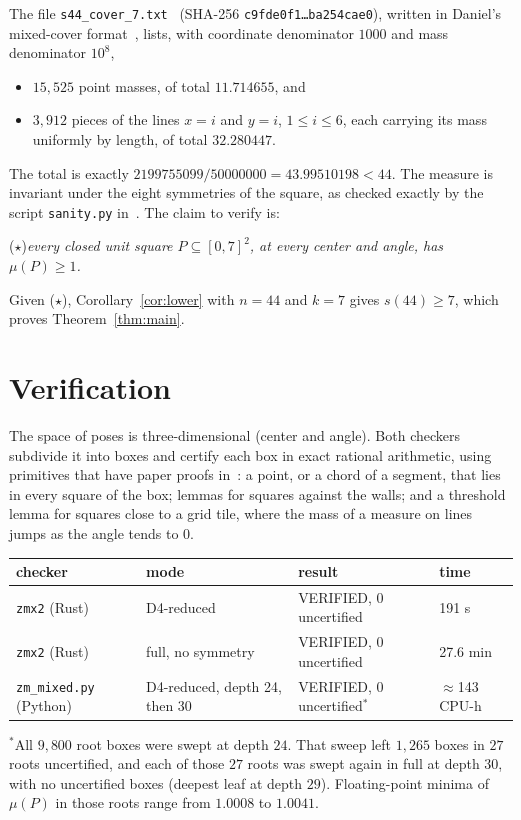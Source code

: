 \documentclass[11pt]{amsart}
\theoremstyle{remark}
\begin{document}
The file \texttt{s44\_cover\_7.txt}~\cite{repo} (SHA-256 \texttt{c9fde0f1\ldots ba254cae0}), written in Daniel's
mixed-cover format~\cite{daniel}, lists, with coordinate denominator $1000$ and mass denominator $10^8$,
\begin{itemize}
\item $15{,}525$ point masses, of total $11.714655$, and
\item $3{,}912$ pieces of the lines $x=i$ and $y=i$, $1\le i\le6$, each carrying its mass uniformly by length, of
total $32.280447$.
\end{itemize}
The total is exactly $2199755099/50000000=43.99510198<44$. The measure is invariant under the eight symmetries
of the square, as checked exactly by the script \texttt{sanity.py} in~\cite{repo}. The claim to verify is:

\smallskip
\noindent($\star$)\quad \emph{every closed unit square $P\subseteq[0,7]^2$, at every center and angle, has
$\mu(P)\ge1$.}
\smallskip

\noindent Given ($\star$), Corollary~\ref{cor:lower} with $n=44$ and $k=7$ gives $s(44)\ge7$, which proves
Theorem~\ref{thm:main}.

\section{Verification}

The space of poses is three-dimensional (center and angle). Both checkers subdivide it into boxes and certify each
box in exact rational arithmetic, using primitives that have paper proofs in~\cite{daniel}: a point, or a chord of
a segment, that lies in every square of the box; lemmas for squares against the walls; and a threshold lemma for
squares close to a grid tile, where the mass of a measure on lines jumps as the angle tends to $0$.

\begin{center}
\begin{tabular}{llll}
\toprule
checker & mode & result & time \\
\midrule
\texttt{zmx2} (Rust) & D4-reduced & VERIFIED, 0 uncertified & 191 s \\
\texttt{zmx2} (Rust) & full, no symmetry & VERIFIED, 0 uncertified & 27.6 min \\
\texttt{zm\_mixed.py} (Python) & D4-reduced, depth 24, then 30 & VERIFIED, 0 uncertified$^*$ & $\approx$143 CPU-h \\
\bottomrule
\end{tabular}
\end{center}
{\small $^*$All $9{,}800$ root boxes were swept at depth $24$. That sweep left $1{,}265$ boxes in $27$ roots
uncertified, and each of those $27$ roots was swept again in full at depth $30$, with no uncertified boxes (deepest
leaf at depth $29$). Floating-point minima of $\mu(P)$ in those roots range from $1.0008$ to $1.0041$.}
\end{document}
